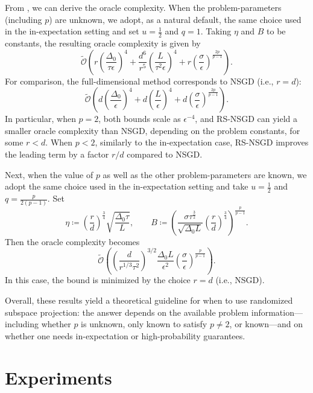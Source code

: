 \documentclass[10pt]{article}
\begin{document}
From , we can  derive the oracle complexity.
When the problem-parameters (including $p$) are unknown, we adopt, as a natural default, the same choice used in the in-expectation setting and set
$u=\tfrac{1}{2}$ and $q=1$.
Taking $\eta$ and $B$ to be constants,
the resulting oracle complexity is given by
\[
\tilde{\mathcal{O}}\!\left(
r\left(\frac{\Delta_0}{\tau\epsilon}\right)^4
+
\frac{d^6}{r^5}
\left(\frac{L}{\tau^2 \epsilon}\right)^4
+
r\left(\frac{\sigma}{\epsilon}\right)^{\frac{2p}{p-1}}
\right).
\]
For comparison, the full-dimensional method corresponds to NSGD (i.e., $r=d$):
\[
\tilde{\mathcal{O}}\!\left(
d\left(\frac{\Delta_0}{\epsilon}\right)^4
+
d\left(\frac{L}{\epsilon}\right)^4
+
d\left(\frac{\sigma}{\epsilon}\right)^{\frac{2p}{p-1}}
\right).
\]
In particular, when $p=2$, both bounds scale as $\epsilon^{-4}$, and RS-NSGD can yield a smaller oracle complexity than NSGD, depending on the problem constants, for some $r<d$.
When $p<2$, similarly to the in-expectation case, RS-NSGD improves the leading term by a factor $r/d$ compared to NSGD.




Next, when the value of $p$ as well as the other problem-parameters are known,
we adopt the same choice used in the in-expectation setting and take
$u=\tfrac{1}{2}$ and $q=\tfrac{p}{2(p-1)}$.
Set
\[
\eta \coloneqq
\left(\frac{r}{d}\right)^{\frac{3}{4}}
\sqrt{\frac{\Delta_0 \tau}{L}},
\qquad
B \coloneqq
\left(
\frac{\sigma \tau^{\frac{3}{2}}}{\sqrt{\Delta_0 L}}
\left(\frac{r}{d}\right)^{\frac{3}{4}}
\right)^{\frac{p}{p-1}}.
\]
Then 
the oracle complexity becomes
\[
\tilde{\mathcal{O}}\!\left(
\left(\frac{d}{r^{1/3}\tau^2}\right)^{3/2}
\frac{\Delta_0 L}{\epsilon^2}
\left(\frac{\sigma}{\epsilon}\right)^{\frac{p}{p-1}}
\right).
\]
In this case, the bound is minimized by the choice $r=d$ (i.e., NSGD).


Overall, these results yield a theoretical guideline for when to use randomized subspace projection:
the answer depends on the available problem information—including whether $p$ is unknown, only known to satisfy $p\neq 2$, or known—and on whether one needs in-expectation or high-probability guarantees.



\section{Experiments}
\end{document}
